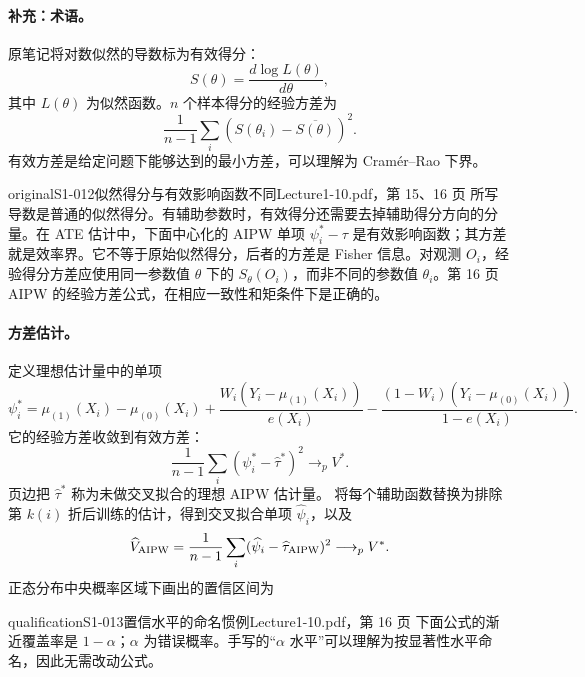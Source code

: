 \paragraph{补充：术语。}
原笔记将对数似然的导数标为有效得分：
\[
S(\theta)=\frac{d\log L(\theta)}{d\theta},
\]
其中 $L(\theta)$ 为似然函数。$n$ 个样本得分的经验方差为
\[
\frac1{n-1}\sum_i(S(\theta_i)-\overline{S(\theta)})^2.
\]
有效方差是给定问题下能够达到的最小方差，可以理解为 Cramér--Rao 下界。
\begin{reviewnote}{original}{S1-012}{似然得分与有效影响函数不同}{Lecture1-10.pdf，第 15、16 页}
所写导数是普通的似然得分。有辅助参数时，有效得分还需要去掉辅助得分方向的分量。在 ATE 估计中，下面中心化的 AIPW 单项 $\psi_i^*-\tau$ 是有效影响函数；其方差就是效率界。它不等于原始似然得分，后者的方差是 Fisher 信息。对观测 $O_i$，经验得分方差应使用同一参数值 $\theta$ 下的 $S_\theta(O_i)$，而非不同的参数值 $\theta_i$。第 16 页 AIPW 的经验方差公式，在相应一致性和矩条件下是正确的。
\end{reviewnote}


\paragraph{方差估计。}
定义理想估计量中的单项
\[
\psi_i^*=\mu_{(1)}(X_i)-\mu_{(0)}(X_i)
+\frac{W_i(Y_i-\mu_{(1)}(X_i))}{e(X_i)}
-\frac{(1-W_i)(Y_i-\mu_{(0)}(X_i))}{1-e(X_i)}.
\]
它的经验方差收敛到有效方差：
\[
\frac1{n-1}\sum_i(\psi_i^*-\widehat\tau^*)^2\longrightarrow_p V^*.
\]
页边把 $\widehat\tau^*$ 称为未做交叉拟合的理想 AIPW 估计量。
将每个辅助函数替换为排除第 $k(i)$ 折后训练的估计，得到交叉拟合单项 $\widehat\psi_i$，以及
\[
\widehat V_{\rm AIPW}=\frac1{n-1}\sum_i(\widehat\psi_i-\widehat\tau_{\rm AIPW})^2\longrightarrow_p V^*.
\]
正态分布中央概率区域下画出的置信区间为
\begin{center}\end{center}

\begin{reviewnote}{qualification}{S1-013}{置信水平的命名惯例}{Lecture1-10.pdf，第 16 页}
下面公式的渐近覆盖率是 $1-\alpha$；$\alpha$ 为错误概率。手写的“$\alpha$ 水平”可以理解为按显著性水平命名，因此无需改动公式。
\end{reviewnote}

